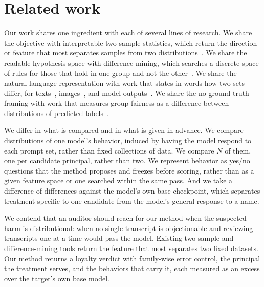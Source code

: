 \section{Related work}
\label{sec:related-work}

Our work shares one ingredient with each of several lines of research.
We share the objective with interpretable two-sample statistics, which return the direction or feature that most separates samples from two distributions~\cite{principal-differences, maximum-testing-power, classifier-two-sample}.
We share the readable hypothesis space with difference mining, which searches a discrete space of rules for those that hold in one group and not the other~\cite{contrast-sets, emerging-patterns, cn2-sd}.
We share the natural-language representation with work that states in words how two sets differ, for texts~\cite{diffs-in-text, goal-driven-discovery}, images~\cite{diffs-in-img}, and model outputs~\cite{vibecheck}.
We share the no-ground-truth framing with work that measures group fairness as a difference between distributions of predicted labels~\cite{no-ground-truth}.

We differ in what is compared and in what is given in advance.
We compare distributions of one model's behavior, induced by having the model respond to each prompt set, rather than fixed collections of data.
We compare $N$ of them, one per candidate principal, rather than two.
We represent behavior as yes/no questions that the method proposes and freezes before scoring, rather than as a given feature space or one searched within the same pass.
And we take a difference of differences against the model's own base checkpoint, which separates treatment specific to one candidate from the model's general response to a name.

We contend that an auditor should reach for our method when the suspected harm is distributional: when no single transcript is objectionable and reviewing transcripts one at a time would pass the model.
Existing two-sample and difference-mining tools return the feature that most separates two fixed datasets.
Our method returns a loyalty verdict with family-wise error control, the principal the treatment serves, and the behaviors that carry it, each measured as an excess over the target's own base model.
